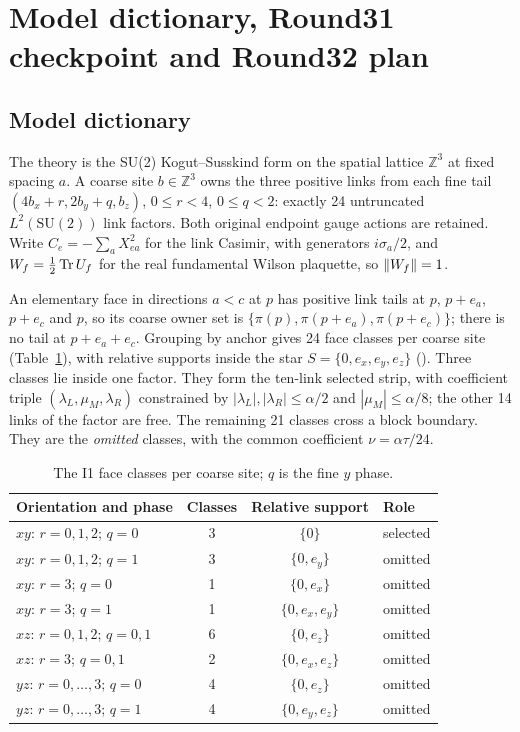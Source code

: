 \section{Model dictionary, Round31 checkpoint and Round32 plan}
\label{sec:model}

\subsection{Model dictionary}
\label{sec:dictionary}

The theory is the SU(2) Kogut--Susskind form on the spatial lattice
$\mathbb Z^3$ at fixed spacing $a$. A coarse site $b\in\mathbb Z^3$ owns the
three positive links from each fine tail $(4b_x+r,2b_y+q,b_z)$, $0\le r<4$,
$0\le q<2$: exactly 24 untruncated $L^2(\mathrm{SU}(2))$ link factors. Both
original endpoint gauge actions are retained. Write $C_e=-\sum_aX_{ea}^2$ for
the link Casimir, with generators $i\sigma_a/2$, and $W_f=\tfrac12\operatorname{Tr} U_f$ for
the real fundamental Wilson plaquette, so $\left\lVert W_f\right\rVert=1$.

An elementary face in directions $a<c$ at $p$ has positive link tails at $p$,
$p+e_a$, $p+e_c$ and $p$, so its coarse owner set is
$\{\pi(p),\pi(p+e_a),\pi(p+e_c)\}$; there is no tail at $p+e_a+e_c$. Grouping
by anchor gives 24 face classes per coarse site
(Table~\ref{tab:dict-classes}), with relative supports inside the star
$S=\{0,e_x,e_y,e_z\}$ (). Three classes lie inside one factor. They
form the ten-link selected strip, with coefficient triple
$(\lambda_L,\mu_M,\lambda_R)$ constrained by
$|\lambda_L|,|\lambda_R|\le\alpha/2$ and $|\mu_M|\le\alpha/8$; the other 14
links of the factor are free. The remaining 21 classes cross a block boundary.
They are the \emph{omitted} classes, with the common coefficient
$\nu=\alpha\tau/24$.

\begin{table}[htbp]
\centering\small
\caption{The I1 face classes per coarse site; $q$ is the fine $y$ phase.}
\label{tab:dict-classes}
\begin{tabular}{lccl}
\toprule
Orientation and phase & Classes & Relative support & Role\\
\midrule
$xy$: $r=0,1,2$; $q=0$ & 3 & $\{0\}$ & selected\\
$xy$: $r=0,1,2$; $q=1$ & 3 & $\{0,e_y\}$ & omitted\\
$xy$: $r=3$; $q=0$ & 1 & $\{0,e_x\}$ & omitted\\
$xy$: $r=3$; $q=1$ & 1 & $\{0,e_x,e_y\}$ & omitted\\
$xz$: $r=0,1,2$; $q=0,1$ & 6 & $\{0,e_z\}$ & omitted\\
$xz$: $r=3$; $q=0,1$ & 2 & $\{0,e_x,e_z\}$ & omitted\\
$yz$: $r=0,\dots,3$; $q=0$ & 4 & $\{0,e_z\}$ & omitted\\
$yz$: $r=0,\dots,3$; $q=1$ & 4 & $\{0,e_y,e_z\}$ & omitted\\
\bottomrule
\end{tabular}
\end{table}

